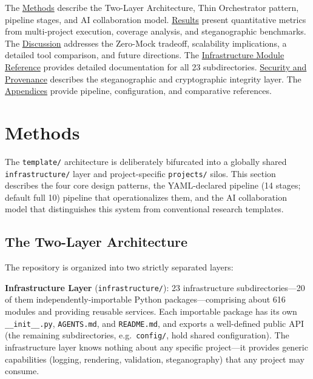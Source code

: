 \documentclass[
]{article}
\begin{document}
The \href{03a_architecture.md\#methods}{Methods} describe the Two-Layer
Architecture, Thin Orchestrator pattern, pipeline stages, and AI
collaboration model. \href{04_results.md\#results}{Results} present
quantitative metrics from multi-project execution, coverage analysis,
and steganographic benchmarks. The
\href{05a_zeromock_tradeoff.md\#the-zero-mock-tradeoff}{Discussion}
addresses the Zero-Mock tradeoff, scalability implications, a detailed
tool comparison, and future directions. The
\href{06_infrastructure_modules.md\#infrastructure-module-reference}{Infrastructure
Module Reference} provides detailed documentation for all 23
subdirectories.
\href{07_security_provenance.md\#security-and-provenance}{Security and
Provenance} describes the steganographic and cryptographic integrity
layer. The
\href{08a_appendix_pipeline.md\#appendix-pipeline}{Appendices} provide
pipeline, configuration, and comparative references.

\newpage

\section{Methods}\label{methods}

The \texttt{template/} architecture is deliberately bifurcated into a
globally shared \texttt{infrastructure/} layer and project-specific
\texttt{projects/} silos. This section describes the four core design
patterns, the YAML-declared pipeline (14 stages; default full 10)
pipeline that operationalizes them, and the AI collaboration model that
distinguishes this system from conventional research templates.

\subsection{The Two-Layer
Architecture}\label{the-two-layer-architecture}

The repository is organized into two strictly separated layers:

\textbf{Infrastructure Layer} (\texttt{infrastructure/}): 23
infrastructure subdirectories---20 of them independently-importable
Python packages---comprising about 616 modules and providing
reusable services. Each importable package has its own
\texttt{\_\_init\_\_.py}, \texttt{AGENTS.md}, and \texttt{README.md},
and exports a well-defined public API (the remaining subdirectories,
e.g.~\texttt{config/}, hold shared configuration). The infrastructure
layer knows nothing about any specific project---it provides generic
capabilities (logging, rendering, validation, steganography) that any
project may consume.
\end{document}
